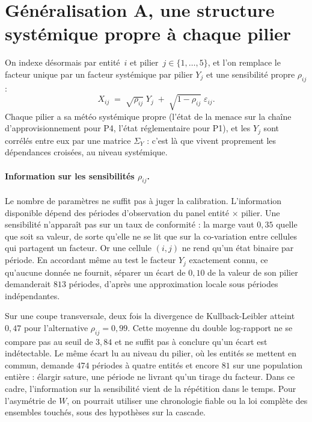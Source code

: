 

\section{Généralisation A, une structure systémique propre à chaque pilier}

On indexe désormais par entité~$i$ et pilier~$j\in\{1,\dots,5\}$, et l'on remplace le facteur
unique par un facteur systémique par pilier $Y_j$ et une sensibilité propre
$\rho_{ij}$ :
\begin{equation}
X_{ij} \;=\; \sqrt{\rho_{ij}}\;Y_j \;+\; \sqrt{1-\rho_{ij}}\;\varepsilon_{ij}.
\end{equation}
Chaque pilier a sa \og météo systémique\fg{} propre (l'état de la menace sur la chaîne
d'approvisionnement pour P4, l'état réglementaire pour P1), et les $Y_j$ sont corrélés entre eux
par une matrice $\Sigma_Y$ : c'est là que vivent proprement les dépendances croisées, au niveau
systémique.

\paragraph{Information sur les sensibilités $\rho_{ij}$.} Le nombre de paramètres ne suffit pas à juger la calibration.
L'information disponible dépend des périodes d'observation du panel entité $\times$ pilier. Une sensibilité n'apparaît pas sur un
taux de conformité : la marge vaut $0{,}35$ quelle que soit sa valeur, de sorte qu'elle ne se lit
que sur la co-variation entre cellules qui partagent un facteur. Or une cellule $(i,j)$ ne rend
qu'un état binaire par période. En accordant même au test le facteur $Y_j$ exactement connu, ce
qu'aucune donnée ne fournit, séparer un écart de $0{,}10$ de la valeur de son pilier demanderait
$813$ périodes, d'après une approximation locale sous périodes indépendantes.

Sur une coupe transversale, deux fois la divergence de Kullback-Leibler atteint $0{,}47$ pour l'alternative $\rho_{ij}=0{,}99$.
Cette moyenne du double log-rapport ne se compare pas au seuil de $3{,}84$ et ne suffit pas à conclure qu'un écart est indétectable. Le même écart
lu au niveau du pilier, où les entités se mettent en commun, demande $474$ périodes à quatre
entités et encore $81$ sur une population entière : élargir sature, une période ne livrant qu'un
tirage du facteur. Dans ce cadre, l'information sur la sensibilité vient de la répétition dans le temps.
Pour l'asymétrie de $W$, on pourrait utiliser une chronologie fiable ou la loi complète des ensembles touchés, sous des hypothèses sur la cascade.

